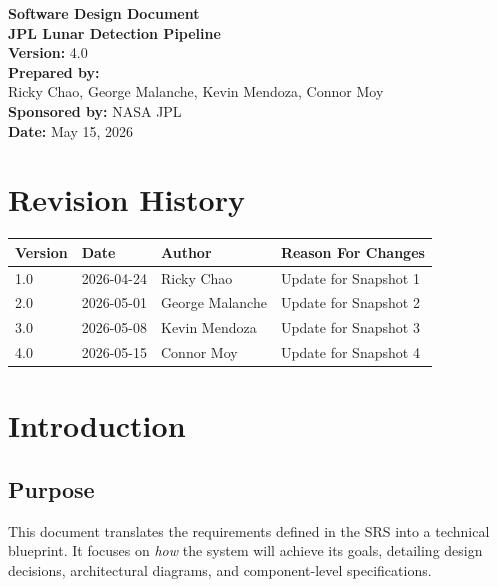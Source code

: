 \documentclass[12pt]{article}
\begin{document}
\begin{titlepage}
    \centering
    \vspace*{2cm}
    {\Huge \textbf{Software Design Document}} \\
    \vspace{0.5cm}
    {\Large \textbf{JPL Lunar Detection Pipeline}} \\
    \vfill
    \textbf{Version:} 4.0 \\
    \textbf{Prepared by:} \\
     Ricky Chao, George Malanche, Kevin Mendoza, Connor Moy \\
    \vspace{1cm}
    \textbf{Sponsored by:} NASA JPL \\
    \textbf{Date:} May 15, 2026
\end{titlepage}

\newpage
\tableofcontents
\newpage

\section*{Revision History}
\begin{tabularx}{\textwidth}{|l|l|l|X|}
\hline
\textbf{Version} & \textbf{Date} & \textbf{Author} & \textbf{Reason For Changes} \\ \hline
1.0 & 2026-04-24 & Ricky Chao & Update for Snapshot 1 \\ \hline
2.0 & 2026-05-01 & George Malanche & Update for Snapshot 2\\ \hline
3.0 & 2026-05-08 & Kevin Mendoza & Update for Snapshot 3 \\ \hline
4.0 & 2026-05-15 & Connor Moy & Update for Snapshot 4 \\ \hline
\end{tabularx}


\section{Introduction}
\subsection{Purpose}
This document translates the requirements defined in the SRS into a technical blueprint. It focuses on \textit{how} the system will achieve its goals, detailing design decisions, architectural diagrams, and component-level specifications.
\end{document}
